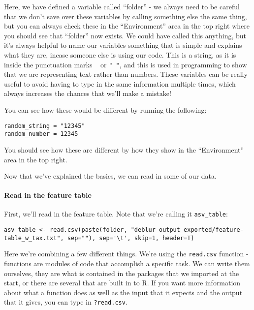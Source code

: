 \documentclass[
]{book}
\begin{document}
Here, we have defined a variable called ``folder'' - we always need to be careful that we don't save over these variables by calling something else the same thing, but you can always check these in the ``Environment'' area in the top right where you should see that ``folder'' now exists. We could have called this anything, but it's always helpful to name our variables something that is simple and explains what they are, incase someone else is using our code. This is a string, as it is inside the punctuation marks \texttt{\textquotesingle{}\ \textquotesingle{}} or \texttt{"\ "}, and this is used in programming to show that we are representing text rather than numbers. These variables can be really useful to avoid having to type in the same information multiple times, which always increases the chances that we'll make a mistake!

You can see how these would be different by running the following:

\begin{verbatim}
random_string = "12345"
random_number = 12345
\end{verbatim}

You should see how these are different by how they show in the ``Environment'' area in the top right.

Now that we've explained the basics, we can read in some of our data.

\paragraph{Read in the feature table}\label{read-in-the-feature-table}

First, we'll read in the feature table. Note that we're calling it \texttt{asv\_table}:

\begin{verbatim}
asv_table <- read.csv(paste(folder, "deblur_output_exported/feature-table_w_tax.txt", sep=""), sep='\t', skip=1, header=T)
\end{verbatim}

Here we're combining a few different things. We're using the \texttt{read.csv} function - functions are modules of code that accomplish a specific task. We can write them ourselves, they are what is contained in the packages that we imported at the start, or there are several that are built in to R. If you want more information about what a function does as well as the input that it expects and the output that it gives, you can type in \texttt{?read.csv}.
\end{document}

